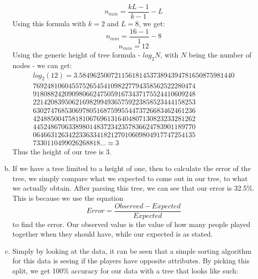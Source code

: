 \documentclass[12pt]{article}%
\begin{document}
\begin{enumerate}[a.]
        \[n_{min} = \frac{kL -1}{k -1} - L\]
        Using this formula with $k=2$ and $L=8$, we get:
        \[n_{min} = \frac{16 -1}{1} - 8\]
        \[n_{min} = 12\]
        Using the generic height of tree formula - $log_2N$, with $N$ being the number of nodes - we can get:
        \begin{multline*}
        log_2(12) = 3.58496250072115618145373894394781650875981440\\
        7692481060455752654541098227794358562522280474\\
        9180882420909806624750591673437175524410609248\\
        2214208395062169829949365759223858523444158253\\
        6302747685306978051687599554473726683462461236\\
        4248850047581810676961316404807130823233281262\\
        4452486706338980148372342357836624783901189770\\
        0646631263422336334182127010609804917747254135\\
        7330110499026268818... \approx 3
        \end{multline*}
        Thus the height of our tree is 3.
        \item
        If we have a tree limited to a height of one, then to calculate the error of the tree, we simply compare what we expected to come out in our tree, to what we actually obtain. After parsing this tree, we can see that our error is 32.5\%. This is because we use the equation
            \[Error = \frac{Observed - Expected}{Expected}\]
        to find the error. Our observed value is the value of how many people played together when they should have, while our expected is as stated.
        \item
        Simply by looking at the data, it can be seen that a simple sorting algorithm for this data is seeing if the players have opposite attributes. By picking this split, we get 100\% accuracy for our data with a tree that looks like such:
        \begin{center}
\end{center}
\end{enumerate}
\end{document}
